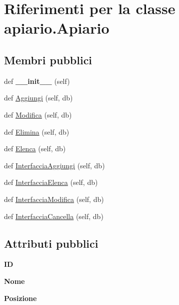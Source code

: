 \hypertarget{classapiario_1_1Apiario}{}\section{Riferimenti per la classe apiario.\+Apiario}
\label{classapiario_1_1Apiario}
\subsection*{Membri pubblici}
\begin{DoxyCompactItemize}
\item 
def {\bfseries \+\_\+\+\_\+init\+\_\+\+\_\+} (self)\hypertarget{classapiario_1_1Apiario_a2388ff9f706e0a39a2fd1e29c7ac1bdb}{}\label{classapiario_1_1Apiario_a2388ff9f706e0a39a2fd1e29c7ac1bdb}

\item 
def \hyperlink{classapiario_1_1Apiario_a1ec949f05e65711cbf25a32a50791c3c}{Aggiungi} (self, db)
\item 
def \hyperlink{classapiario_1_1Apiario_abf2cc07e8590670d699386a2575a9e6a}{Modifica} (self, db)
\item 
def \hyperlink{classapiario_1_1Apiario_a812018e289ab2eb91307fc56fdd2a71f}{Elimina} (self, db)
\item 
def \hyperlink{classapiario_1_1Apiario_ac3f149015b029e8979ca47b15de03a41}{Elenca} (self, db)
\item 
def \hyperlink{classapiario_1_1Apiario_aeabed078a068bb98c5ae56c356d65071}{Interfaccia\+Aggiungi} (self, db)
\item 
def \hyperlink{classapiario_1_1Apiario_a1eb6bcdeaffc4fd78e53aba543d3c6c9}{Interfaccia\+Elenca} (self, db)
\item 
def \hyperlink{classapiario_1_1Apiario_a3c6a4493732e78ce923c77b84e06dc13}{Interfaccia\+Modifica} (self, db)
\item 
def \hyperlink{classapiario_1_1Apiario_a97b4ee9a62a3708b72dfa92bf3db2050}{Interfaccia\+Cancella} (self, db)
\end{DoxyCompactItemize}
\subsection*{Attributi pubblici}
\begin{DoxyCompactItemize}
\item 
{\bfseries ID}\hypertarget{classapiario_1_1Apiario_a0a28be9d95959e9987f500f2d2ee0057}{}\label{classapiario_1_1Apiario_a0a28be9d95959e9987f500f2d2ee0057}

\item 
{\bfseries Nome}\hypertarget{classapiario_1_1Apiario_a13ee679f6520f3003fb99f082e43e7a4}{}\label{classapiario_1_1Apiario_a13ee679f6520f3003fb99f082e43e7a4}

\item 
{\bfseries Posizione}\hypertarget{classapiario_1_1Apiario_a0d3abd32a2ee602b62c4436e354d774d}{}\label{classapiario_1_1Apiario_a0d3abd32a2ee602b62c4436e354d774d}

\end{DoxyCompactItemize}


